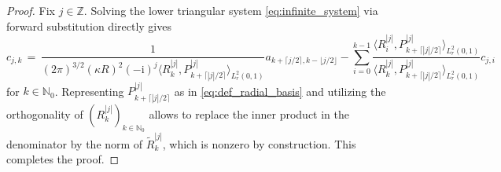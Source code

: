 \documentclass[10pt,a4paper]{amsart}
\newcommand{\N}{\field{N}}
\newcommand{\Z}{\field{Z}}
\newcommand{\field}[1]{{\mathbb{#1}}}
\newcommand{\rmi}{\mathrm{i}}
\begin{document}
\begin{proof}
Fix $j \in \Z$. Solving the lower triangular system \eqref{eq:infinite_system} via forward substitution directly gives
\begin{equation*}
	c_{j,k} \,=\, \frac 1 {(2\pi)^{3/2}(\kappa R)^2(-\rmi)^j \big \langle R_{k}^{|j|}, P_{k+\lceil |j|/2\rceil}^{|j|} \big \rangle_{L^2_r(0,1)}} a_{k+\lceil j/2\rceil, k-\lfloor j/2\rfloor} 
	- \sum_{i=0}^{k-1} \frac{\big \langle R_{i}^{|j|}, P_{k+\lceil |j|/2\rceil}^{|j|} \big \rangle_{L^2_r(0,1)}}{\big \langle R_{k}^{|j|}, P_{k+\lceil |j|/2\rceil}^{|j|}\big \rangle_{L^2_r(0,1)}} c_{j, i} \, 
\end{equation*}
for $k \in \N_0$. Representing $P_{k+\lceil |j|/2\rceil}^{|j|}$ as in \eqref{eq:def_radial_basis} and utilizing the orthogonality of $(R_{k}^{|j|})_{k \in \N_0}$ allows to replace the inner product in the denominator by the norm of $\widetilde{R}_{k}^{|j|}$, which is nonzero by construction. This completes the proof. 
\end{proof}
\end{document}
